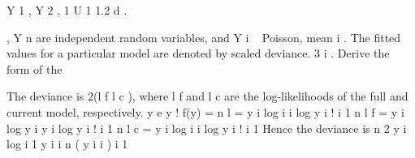\documentclass[a4paper,12pt]{article}
\begin{document}
 



Y 1 , Y 2 ,
1
U
1
1.2
d
.

, Y n are independent random variables, and
Y i ~ Poisson, mean
i .
The fitted values for a particular model are denoted by
scaled deviance.
3
i .
Derive the form of the



The deviance is 2(l f l c ), where l f and l c are the log-likelihoods of the full and current
model, respectively.
y
e
y !
f(y) =
n
l =
y i log
i
i
log y i !
i 1
n
l f =
y i log y i
y i log y i !
i 1
n
l c =
y i log
i
i
log y i !
i 1
Hence the deviance is
n
2
y i log
i 1
y i
i
n
( y i
i )
i 1
\end{document}
